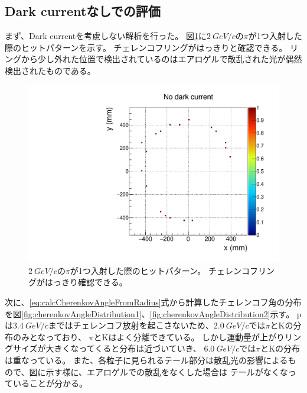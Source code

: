 \subsection{Dark currentなしでの評価}
まず、Dark currentを考慮しない解析を行った。
図\ref{fig:hitpattern1}に$\SI{2}{GeV/c}$の$\pi$が1つ入射した際のヒットパターンを示す。
チェレンコフリングがはっきりと確認できる。
リングから少し外れた位置で検出されているのはエアロゲルで散乱された光が偶然検出されたものである。
\begin{figure}[htbp]
  \centering
  \includegraphics[width=15cm, page=9]{images/chapter4/hitpattern2000MeV_pi.pdf}
  \caption{
    $\SI{2}{GeV/c}$の$\pi$が1つ入射した際のヒットパターン。
    チェレンコフリングがはっきり確認できる。
  }
  \label{fig:hitpattern1}
\end{figure}
次に、\ref{eq:calcCherenkovAngleFromRadius}式から計算したチェレンコフ角の分布を図\ref{fig:cherenkovAngleDistribution1}、\ref{fig:cherenkovAngleDistribution2}示す。
pは$\SI{3.4}{GeV/c}$まではチェレンコフ放射を起こさないため、$\SI{2.0}{GeV/c}$では$\pi$とKの分布のみとなっており、
$\pi$とKはよく分離できている。
しかし運動量が上がりリングサイズが大きくなってくると分布は近づいていき、
$\SI{6.0}{GeV/c}$では$\pi$とKの分布は重なっている。
また、各粒子に見られるテール部分は散乱光の影響によるもので、図に示す様に、エアロゲルでの散乱をなくした場合は
テールがなくなっていることが分かる。
